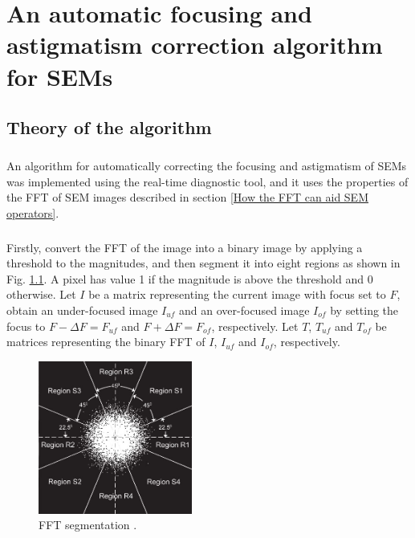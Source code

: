 \documentclass[12pt, twocolumn]{report}
\begin{document}
\chapter{An automatic focusing and astigmatism correction algorithm for SEMs} \label{An automatic focusing and astigmatism correction algorithm for SEMs}
\section{Theory of the algorithm}
\paragraph{}
An algorithm for automatically correcting the focusing and astigmatism of SEMs \cite{SEM correction algorithm} was implemented using the real-time diagnostic tool, and it uses the properties of the FFT of SEM images described in section \ref{How the FFT can aid SEM operators}.

\paragraph{}
Firstly, convert the FFT of the image into a binary image by applying a threshold to the magnitudes, and then segment it into eight regions as shown in Fig. \ref{Correction algorithm FFT segmentation}. A pixel has value 1 if the magnitude is above the threshold and 0 otherwise. Let $I$ be a matrix representing the current image with focus set to $F$, obtain an under-focused image $I_{uf}$ and an over-focused image $I_{of}$ by setting the focus to $F-\Delta F=F_{uf}$ and $F+\Delta F=F_{of}$, respectively. Let $T$, $T_{uf}$ and $T_{of}$ be matrices representing the binary FFT of $I$, $I_{uf}$ and $I_{of}$, respectively.

\begin{figure}[htbp]
    \centering
    \includegraphics[width=0.45\textwidth]{Figures/Correction algorithm FFT segmentation.jpg}
    \caption{FFT segmentation \cite{SEM correction algorithm}.}
    \label{Correction algorithm FFT segmentation}
\end{figure}
\end{document}

